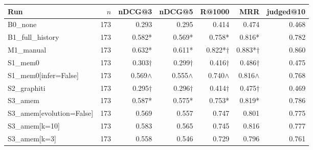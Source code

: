 \begin{tabular}{l r r r r r r}
\toprule
Run & $n$ & nDCG@3 & nDCG@5 & R@1000 & MRR & judged@10 \\
\midrule
B0\_none & 173 & 0.293 & 0.295 & 0.414 & 0.474 & 0.468 \\
B1\_full\_history & 173 & 0.582* & 0.569* & 0.758* & 0.816* & 0.782 \\
M1\_manual & 173 & 0.632* & 0.611* & 0.822*$\dagger$ & 0.883*$\dagger$ & 0.860 \\
S1\_mem0 & 173 & 0.303$\dagger$ & 0.299$\dagger$ & 0.416$\dagger$ & 0.486$\dagger$ & 0.475 \\
S1\_mem0[infer=False] & 173 & 0.569$\wedge$ & 0.555$\wedge$ & 0.740$\wedge$ & 0.816$\wedge$ & 0.768 \\
S2\_graphiti & 173 & 0.295$\dagger$ & 0.296$\dagger$ & 0.414$\dagger$ & 0.475$\dagger$ & 0.469 \\
S3\_amem & 173 & 0.587* & 0.575* & 0.753* & 0.819* & 0.786 \\
S3\_amem[evolution=False] & 173 & 0.569 & 0.557 & 0.747 & 0.801 & 0.775 \\
S3\_amem[k=10] & 173 & 0.583 & 0.565 & 0.745 & 0.816 & 0.777 \\
S3\_amem[k=3] & 173 & 0.558 & 0.546 & 0.729 & 0.796 & 0.761 \\
\bottomrule
\end{tabular}
